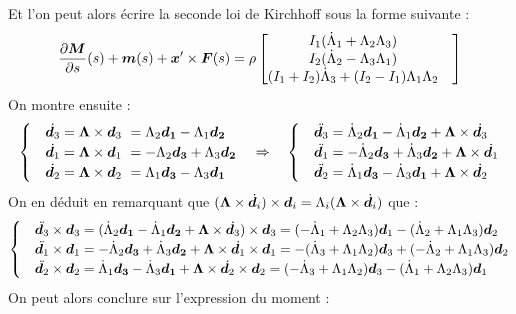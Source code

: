 Et l'on peut alors écrire la seconde loi de Kirchhoff sous la forme suivante :
\begin{equation}
	\begin{aligned}
		\frac{\partial \boldsymbol{M}}{\partial s}(s)+\boldsymbol{m}(s) + \boldsymbol{x}'\times \boldsymbol{F}(s)
		= \rho
			\begin{bmatrix}
				I_1 (\dot{\Lambda}_1 + \Lambda_2 \Lambda_3) &\\
				I_2 (\dot{\Lambda}_2 - \Lambda_3 \Lambda_1) &\\
				(I_1 + I_2)\dot{\Lambda}_3 + (I_2 - I_1)\Lambda_1\Lambda_2&
			\end{bmatrix}
	\end{aligned}
\end{equation}
On montre ensuite :
\begin{equation}
\begin{cases}
&\dot{\boldsymbol{d}_3} 	= \boldsymbol{\Lambda}\times \boldsymbol{d}_3\  
				= \Lambda_2\boldsymbol{d_1} - \Lambda_1\boldsymbol{d_2}\\
&\dot{\boldsymbol{d}_1} 	= \boldsymbol{\Lambda}\times \boldsymbol{d}_1\  
				= -\Lambda_2\boldsymbol{d_3} + \Lambda_3\boldsymbol{d_2}\\
&\dot{\boldsymbol{d}_2} 	= \boldsymbol{\Lambda}\times \boldsymbol{d}_2\  
				= \Lambda_1\boldsymbol{d_3} - \Lambda_3\boldsymbol{d_1}\\
\end{cases}
\quad\Rightarrow\quad
\begin{cases}
&\ddot{\boldsymbol{d}_3} 	= \dot{\Lambda}_2\boldsymbol{d_1} - \dot{\Lambda}_1\boldsymbol{d_2} 
				+ \boldsymbol{\Lambda} \times \dot{\boldsymbol{d}_3}\\
&\ddot{\boldsymbol{d}_1} 	= -\dot{\Lambda}_2\boldsymbol{d_3} + \dot{\Lambda}_3\boldsymbol{d_2}
				+ \boldsymbol{\Lambda} \times \dot{\boldsymbol{d}_1}\\
&\ddot{\boldsymbol{d}_2} 	= \dot{\Lambda}_1\boldsymbol{d_3} - \dot{\Lambda}_3\boldsymbol{d_1}
				+ \boldsymbol{\Lambda} \times \dot{\boldsymbol{d}_2}		
\end{cases}
\end{equation}
On en déduit en remarquant que $(\boldsymbol{\Lambda}\times\dot{\boldsymbol{d}_i})\times\boldsymbol{d}_i = \Lambda_i(\boldsymbol{\Lambda}\times\dot{\boldsymbol{d}_i})$ que :
\begin{equation}
\begin{cases}
&\ddot{\boldsymbol{d}_3}\times\boldsymbol{d}_3 	
			= (\dot{\Lambda}_2\boldsymbol{d_1} - \dot{\Lambda}_1\boldsymbol{d_2} 
				+ \boldsymbol{\Lambda} \times \dot{\boldsymbol{d}_3}) \times \boldsymbol{d}_3
			= (- \dot{\Lambda}_1 + \Lambda_2\Lambda_3)\boldsymbol{d}_1
			-(\dot{\Lambda}_2 + \Lambda_1\Lambda_3)\boldsymbol{d}_2\\
&\ddot{\boldsymbol{d}_1}\times\boldsymbol{d}_1	
			= -\dot{\Lambda}_2\boldsymbol{d_3} + \dot{\Lambda}_3\boldsymbol{d_2}
				+ \boldsymbol{\Lambda} \times \dot{\boldsymbol{d}_1} \times \boldsymbol{d}_1
			= -(\dot{\Lambda}_3 + \Lambda_1\Lambda_2)\boldsymbol{d}_3
			+(-\dot{\Lambda}_2 + \Lambda_1\Lambda_3)\boldsymbol{d}_2\\
&\ddot{\boldsymbol{d}_2} \times\boldsymbol{d}_2	
			= \dot{\Lambda}_1\boldsymbol{d_3} - \dot{\Lambda}_3\boldsymbol{d_1}
				+ \boldsymbol{\Lambda} \times \dot{\boldsymbol{d}_2}  \times \boldsymbol{d}_2
			= (- \dot{\Lambda}_3 + \Lambda_1\Lambda_2)\boldsymbol{d}_3
			-(\dot{\Lambda}_1 + \Lambda_2\Lambda_3)\boldsymbol{d}_1\\		
\end{cases}
\end{equation}
On peut alors conclure sur l'expression du moment :




